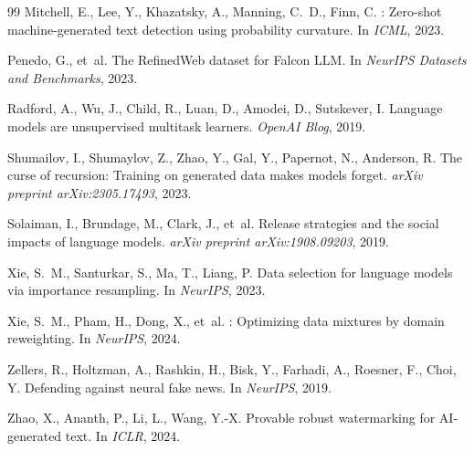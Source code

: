 \documentclass[11pt,a4paper]{article}
\begin{document}
\begin{thebibliography}{99}
Mitchell, E., Lee, Y., Khazatsky, A., Manning, C.~D., Finn, C.
: Zero-shot machine-generated text detection using probability curvature.
\newblock In \emph{ICML}, 2023.

Penedo, G., et~al.
\newblock The {RefinedWeb} dataset for {Falcon LLM}.
\newblock In \emph{NeurIPS Datasets and Benchmarks}, 2023.

Radford, A., Wu, J., Child, R., Luan, D., Amodei, D., Sutskever, I.
\newblock Language models are unsupervised multitask learners.
\newblock \emph{OpenAI Blog}, 2019.

Shumailov, I., Shumaylov, Z., Zhao, Y., Gal, Y., Papernot, N., Anderson, R.
\newblock The curse of recursion: Training on generated data makes models forget.
\newblock \emph{arXiv preprint arXiv:2305.17493}, 2023.

Solaiman, I., Brundage, M., Clark, J., et~al.
\newblock Release strategies and the social impacts of language models.
\newblock \emph{arXiv preprint arXiv:1908.09203}, 2019.

Xie, S.~M., Santurkar, S., Ma, T., Liang, P.
\newblock Data selection for language models via importance resampling.
\newblock In \emph{NeurIPS}, 2023.

Xie, S.~M., Pham, H., Dong, X., et~al.
: Optimizing data mixtures by domain reweighting.
\newblock In \emph{NeurIPS}, 2024.

Zellers, R., Holtzman, A., Rashkin, H., Bisk, Y., Farhadi, A., Roesner, F., Choi, Y.
\newblock Defending against neural fake news.
\newblock In \emph{NeurIPS}, 2019.

Zhao, X., Ananth, P., Li, L., Wang, Y.-X.
\newblock Provable robust watermarking for {AI}-generated text.
\newblock In \emph{ICLR}, 2024.

\end{thebibliography}
\end{document}
